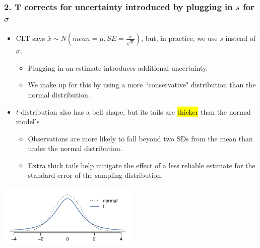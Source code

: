 \documentclass[slidestop,compress,mathserif,12pt,t,professionalfonts,xcolor=table]{beamer}
\begin{document}

\begin{frame}
\frametitle{2. T corrects for uncertainty introduced by plugging in $s$ for $\sigma$}

\begin{itemize}

\item CLT says $\bar{x} \sim N\left(mean = \mu, SE = \frac{\sigma}{\sqrt{n}}\right)$, but, in practice, 
we use $s$ instead of $\sigma$.
\begin{itemize}
\item Plugging in an estimate introduces additional uncertainty.
\item We make up for this by using a more ``conservative" distribution than the normal distribution.
\end{itemize}

\pause

\item $t$-distribution also has a bell shape, but its tails are \hl{thicker} than the normal model's
\begin{itemize}
\item Observations are more likely to fall beyond two SDs from the mean than under the normal distribution.
\item Extra thick tails help mitigate the effect of a less reliable estimate for the standard 
error of the sampling distribution.
\end{itemize}

\end{itemize}

\begin{center}
\includegraphics[width=0.5\textwidth]{figures/tDistCompareToNormalDist/tDistCompareToNormalDist}
\end{center}

\end{frame}

\end{document}

